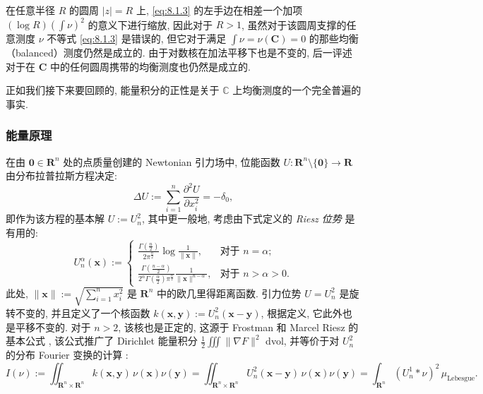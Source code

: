 在任意半径 \(R\) 的圆周 \(|z| = R\) 上, \eqref{eq:8.1.3} 的左手边在相差一个加项 \((\log R) (\int \nu)^2\) 的意义下进行缩放, 
因此对于 \(R > 1\), 虽然对于该圆周支撑的任意测度 \(\nu\) 不等式 \eqref{eq:8.1.3} 是错误的, 
但它对于满足 \(\int \nu = \nu(\mathbf{C}) = 0\) 的那些均衡（balanced）测度仍然是成立的. 
由于对数核在加法平移下也是不变的, 后一评述对于在 \(\mathbf{C}\) 中的任何圆周携带的均衡测度也仍然是成立的.

正如我们接下来要回顾的, 能量积分的正性是关于 \(\mathbb{C}\) 上均衡测度的一个完全普遍的事实.

\subsubsection{能量原理}\label{sec:8.1.4}

在由 \(\mathbf{0} \in \mathbf{R}^n\) 处的点质量创建的 Newtonian 引力场中, 位能函数 \(U : \mathbf{R}^n \setminus \{\mathbf{0}\} \to \mathbf{R}\) 
由分布拉普拉斯方程决定:
\[ \Delta U := \sum_{i=1}^{n} \frac{\partial^2 U}{\partial x_i^2} = -\delta_0, \]
即作为该方程的基本解 \(U := U_n^2\), 其中更一般地, 考虑由下式定义的 \emph{Riesz 位势} \cite{Rie38} 是有用的:
\begin{equation}\label{eq:8.1.5}
U_n^{\alpha}(\mathbf{x}) := \begin{cases} \frac{\Gamma\left(\frac{n}{2}\right)}{2\pi^{\frac{n}{2}}} \log \frac{1}{\|\mathbf{x}\|}, & \text{对于 } n = \alpha; \\ \frac{\Gamma\left(\frac{n-\alpha}{2}\right)}{2^{\alpha}\Gamma\left(\frac{\alpha}{2}\right)\pi^{\frac{n}{2}}} \frac{1}{\|\mathbf{x}\|^{n-\alpha}}, & \text{对于 } n > \alpha > 0. \end{cases}
\end{equation}
此处, \(\|\mathbf{x}\| := \sqrt{\sum_{i=1}^n x_i^2}\) 是 \(\mathbf{R}^n\) 中的欧几里得距离函数. 
引力位势 \(U = U_n^2\) 是旋转不变的, 并且定义了一个核函数 \(k(\mathbf{x},\mathbf{y}) := U_n^2(\mathbf{x}-\mathbf{y})\), 
根据定义, 它此外也是平移不变的. 
对于 \(n>2\), 该核也是正定的, 这源于 Frostman 和 Marcel Riesz 的基本公式 \cite[第 I.3 节]{Rie38}, 
该公式推广了 Dirichlet 能量积分 \(\frac{1}{2} \iiint \|\nabla F\|^2\) dvol, 
并等价于对 \(U_n^2\) 的分布 Fourier 变换的计算 \cite{Den50}\cite{Sch66}\cite{Lan72}\cite{NS91}:
\begin{equation}\label{eq:8.1.6}
I(\nu) := \iint_{\mathbf{R}^n \times \mathbf{R}^n} k(\mathbf{x}, \mathbf{y}) \, \nu(\mathbf{x}) \nu(\mathbf{y}) = \iint_{\mathbf{R}^n \times \mathbf{R}^n} U_n^2(\mathbf{x} - \mathbf{y}) \, \nu(\mathbf{x}) \nu(\mathbf{y}) = \int_{\mathbf{R}^n} \left( U_n^1 * \nu \right)^2 \, \mu_{\text{Lebesgue}}.
\end{equation}
